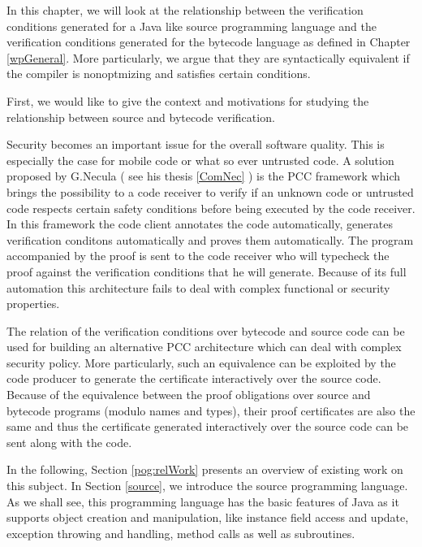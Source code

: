 

In this chapter, we will look at the relationship between
the verification conditions generated for a Java like source programming 
language and the verification conditions generated for the bytecode language 
as defined in Chapter \ref{wpGeneral}. More particularly, we 
argue that they are syntactically equivalent if the compiler is nonoptmizing and satisfies certain 
conditions.
  

First, we would like to give the 
context and motivations for studying the relationship 
between source and bytecode verification.


 Security becomes an important issue for the overall software quality.
This is especially the case for mobile code or what so ever untrusted code. 
A solution  proposed by G.Necula ( see his thesis \ref{ComNec} ) 
is the PCC framework which brings the possibility to a  code receiver to 
verify if an unknown code  or untrusted code respects certain safety conditions before being executed by the code receiver.
In this framework the code client annotates the code automatically, generates verification conditons automatically
 and proves them automatically.
The  program accompanied by the proof  is sent to the code receiver  who will typecheck the proof against 
the verification conditions that he will generate.
Because of its full automation this architecture fails to deal with complex functional or security properties.


The relation of the verification conditions over bytecode and source code can be used for building an
 alternative PCC architecture which can deal with complex security policy. 
More particularly, such an equivalence can be exploited by the code producer to generate
 the certificate interactively over the source code. Because of the
equivalence between the proof obligations over source and bytecode programs (modulo names and types), 
their  proof certificates are also the same and thus the certificate generated interactively over the
 source code can be sent along with the code.   




In the following, Section \ref{pog:relWork} presents an overview of existing work on this subject.
 In Section \ref{source},  we introduce the source programming language. As we shall see,
this programming language has the basic features of Java as it supports object creation and manipulation, like instance 
field access and  update, 
 exception throwing and handling, method calls as well as subroutines.

